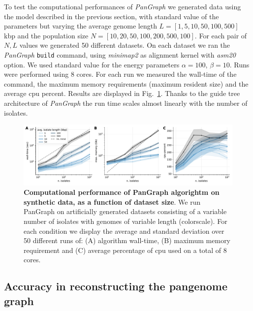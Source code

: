 \documentclass[aps,rmp,reprint,superscriptaddress,notitlepage,10pt,onecolumn]{revtex4-1}
\begin{document}
To test the computational performances of \textit{PanGraph} we generated data using the model described in the previous section, with standard value of the parameters but varying the average genome length $L=[1,5,10,50,100,500]$ kbp and the population size $N=[10,20,50,100,200,500,100]$. For each pair of $N,L$ values we generated 50 different datasets. On each dataset we ran the \textit{PanGraph} \verb|build| command, using \textit{minimap2} as alignment kernel with \textit{asm20} option. We used standard value for the energy parameters $\alpha=100$, $\beta=10$. Runs were performed using 8 cores. For each run we measured the wall-time of the command, the maximum memory requirements (maximum resident size) and the average cpu percent. Results are displayed in Fig.~\ref{fig:benchmark-perf-suppl}.
Thanks to the guide tree architecture of \textit{PanGraph} the run time scales almost linearly with the number of isolates.

\begin{figure}[h]
    \includegraphics[width=.9\textwidth]{figs_suppl/benchmark_suppl.pdf}
    \caption{{\bf Computational performance of PanGraph algorightm on synthetic data, as a function of dataset size}. We run PanGraph on artificially generated datasets consisting of a variable number of isolates with genomes of variable length (colorscale). For each condition we display the average and standard deviation over 50 different runs of: (A) algorithm wall-time, (B) maximum memory requirement and (C) average percentage of cpu used on a total of 8 cores.}
    \label{fig:benchmark-perf-suppl}
\end{figure}


\subsection{Accuracy in reconstructing the pangenome graph}
\end{document}
